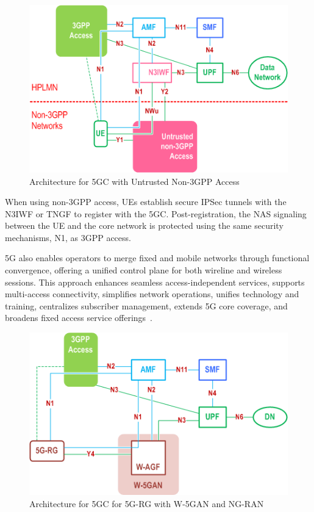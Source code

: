 \begin{figure}
    \centering
    \includegraphics[width=0.5\linewidth]{figs/architecture-for-5g-core-network-with-untrusted-non-3gpp-access.png}
    \caption{Architecture for \ac{5GC} with Untrusted Non-\ac{3GPP} Access}
    \label{fig:architecture-for-5g-core-network-with-untrusted-non-3gpp-access}
\end{figure}

When using non-\ac{3GPP} access, \ac{UE}s establish secure \ac{IPSec} tunnels with the \ac{N3IWF} or \ac{TNGF} to register with the \ac{5GC}. Post-registration, the \ac{NAS} signaling between the \ac{UE} and the core network is protected using the same security mechanisms, N1, as \ac{3GPP} access.

\ac{5G} also enables operators to merge fixed and mobile networks through functional convergence, offering a unified control plane for both wireline and wireless sessions. This approach enhances seamless access-independent services, supports multi-access connectivity, simplifies network operations, unifies technology and training, centralizes subscriber management, extends \ac{5G} core coverage, and broadens fixed access service offerings~\cite{bbf-tr-470-p8}.

\begin{figure}
    \centering
    \includegraphics[width=0.5\linewidth]{figs/Architecture for 5G Core Network for 5G-RG with Wireline 5G Access network and NG RAN.png}
    \caption{Architecture for \ac{5GC} for \acs{5G-RG} with \ac{W-5GAN} and \ac{NG-RAN}}
    \label{fig:Architecture for 5G Core Network for 5G-RG with Wireline 5G Access network and NG RAN}
\end{figure}

